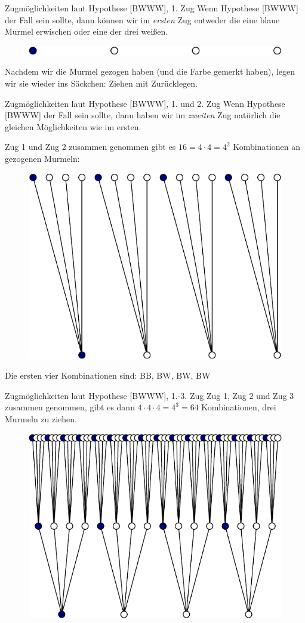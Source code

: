 \documentclass[
  ngerman,
  ignorenonframetext,
]{beamer}
\begin{document}
\begin{frame}{Zugmöglichkeiten laut Hypothese {[}BWWW{]}, 1. Zug}
\protect\hypertarget{zugmuxf6glichkeiten-laut-hypothese-bwww-1.-zug}{}
Wenn Hypothese {[}BWWW{]} der Fall sein sollte, dann können wir im
\emph{ersten} Zug entweder die eine blaue Murmel erwischen oder eine der
drei weißen.

\begin{figure}[H]
\includegraphics[width=0.7\linewidth]{unnamed-chunk-8-1} \end{figure}

Nachdem wir die Murmel gezogen haben (und die Farbe gemerkt haben),
legen wir sie wieder ins Säckchen: Ziehen mit Zurücklegen.
\end{frame}

\begin{frame}{Zugmöglichkeiten laut Hypothese {[}BWWW{]}, 1. und 2. Zug}
\protect\hypertarget{zugmuxf6glichkeiten-laut-hypothese-bwww-1.-und-2.-zug}{}
Wenn Hypothese {[}BWWW{]} der Fall sein sollte, dann haben wir im
\emph{zweiten} Zug natürlich die gleichen Möglichkeiten wie im ersten.

Zug 1 und Zug 2 zusammen genommen gibt es \(16=4\cdot4=4^2\)
Kombinationen an gezogenen Murmeln:

\begin{figure}[H]
\includegraphics[width=0.5\linewidth]{unnamed-chunk-9-1} \end{figure}

Die ersten vier Kombinationen sind: BB, BW, BW, BW
\end{frame}

\begin{frame}{Zugmöglichkeiten laut Hypothese {[}BWWW{]}, 1.-3. Zug}
\protect\hypertarget{zugmuxf6glichkeiten-laut-hypothese-bwww-1.-3.-zug}{}
Zug 1, Zug 2 und Zug 3 zusammen genommen, gibt es dann
\(4\cdot4\cdot4=4^3=64\) Kombinationen, drei Murmeln zu ziehen.

\begin{figure}[H]
\includegraphics[width=0.5\linewidth]{unnamed-chunk-10-1} \end{figure}
\end{frame}
\end{document}
